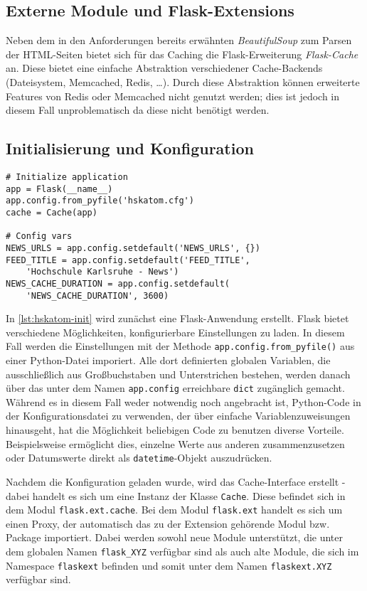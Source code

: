 \subsection{Externe Module und Flask-Extensions}

Neben dem in den Anforderungen bereits erwähnten \emph{BeautifulSoup} zum Parsen der
HTML-Seiten bietet sich für das Caching die Flask-Erweiterung \emph{Flask-Cache} an. Diese bietet
eine einfache Abstraktion verschiedener Cache-Backends (Dateisystem, Memcached, Redis, \ldots).
Durch diese Abstraktion können erweiterte Features von Redis oder Memcached nicht genutzt werden;
dies ist jedoch in diesem Fall unproblematisch da diese nicht benötigt werden.

\subsection{Initialisierung und Konfiguration}

\begin{lstlisting}[caption=HSKAtom - Initialisierung,label=lst:hskatom-init]
# Initialize application
app = Flask(__name__)
app.config.from_pyfile('hskatom.cfg')
cache = Cache(app)

# Config vars
NEWS_URLS = app.config.setdefault('NEWS_URLS', {})
FEED_TITLE = app.config.setdefault('FEED_TITLE',
    'Hochschule Karlsruhe - News')
NEWS_CACHE_DURATION = app.config.setdefault(
    'NEWS_CACHE_DURATION', 3600)
\end{lstlisting}

In \autoref{lst:hskatom-init} wird zunächst eine Flask-Anwendung erstellt. Flask bietet verschiedene
Möglichkeiten, konfigurierbare Einstellungen zu laden. In diesem Fall werden die Einstellungen mit
der Methode \lstinline{app.config.from_pyfile()} aus einer Python-Datei imporiert. Alle dort
definierten globalen Variablen, die ausschließlich aus Großbuchstaben und Unterstrichen bestehen,
werden danach über das unter dem Namen \lstinline{app.config} erreichbare \lstinline{dict}
zugänglich gemacht. Während es in diesem Fall weder notwendig noch angebracht ist, Python-Code in
der Konfigurationsdatei zu verwenden, der über einfache Variablenzuweisungen hinausgeht, hat die
Möglichkeit beliebigen Code zu benutzen diverse Vorteile. Beispielsweise ermöglicht dies, einzelne
Werte aus anderen zusammenzusetzen oder Datumswerte direkt als \lstinline{datetime}-Objekt
auszudrücken.

Nachdem die Konfiguration geladen wurde, wird das Cache-Interface erstellt - dabei handelt es sich
um eine Instanz der Klasse \lstinline{Cache}. Diese befindet sich in dem Modul
\lstinline{flask.ext.cache}. Bei dem Modul \lstinline{flask.ext} handelt es sich um einen Proxy, der
automatisch das zu der Extension gehörende Modul bzw. Package importiert. Dabei werden sowohl neue
Module unterstützt, die unter dem globalen Namen \lstinline{flask_XYZ} verfügbar sind als auch alte
Module, die sich im Namespace \lstinline{flaskext} befinden und somit unter dem Namen
\lstinline{flaskext.XYZ} verfügbar sind.

